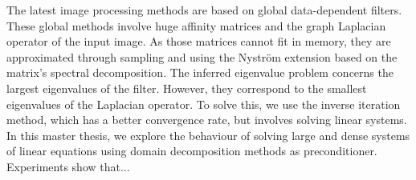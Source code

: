 The latest image processing methods are based on global data-dependent filters.
These global methods involve huge affinity matrices and the graph Laplacian operator of the input image.
As those matrices cannot fit in memory, they are approximated through sampling and using the Nystr\"om extension based on the matrix's spectral decomposition.
The inferred eigenvalue problem concerns the largest eigenvalues of the filter.
However, they correspond to the smallest eigenvalues of the Laplacian operator.
To solve this, we use the inverse iteration method, which has a better convergence rate, but involves solving linear systems.
In this master thesis, we explore the behaviour of solving large and dense systems of linear equations using domain decomposition methods as preconditioner.
Experiments show that...
